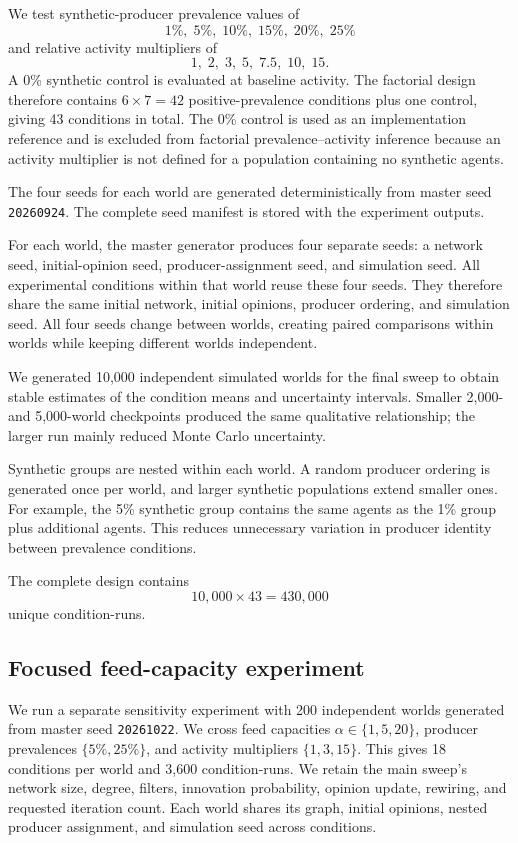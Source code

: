 \documentclass[runningheads]{llncs}
\begin{document}
We test synthetic-producer prevalence values of
\[
1\%,\;5\%,\;10\%,\;15\%,\;20\%,\;25\%
\]
and relative activity multipliers of
\[
1,\;2,\;3,\;5,\;7.5,\;10,\;15.
\]
A 0\% synthetic control is evaluated at baseline activity. The factorial design therefore contains \(6\times7=42\) positive-prevalence conditions plus one control, giving 43 conditions in total. The 0\% control is used as an implementation reference and is excluded from factorial prevalence--activity inference because an activity multiplier is not defined for a population containing no synthetic agents.

The four seeds for each world are generated deterministically from master seed \texttt{20260924}. The complete seed manifest is stored with the experiment outputs.

For each world, the master generator produces four separate seeds: a network seed, initial-opinion seed, producer-assignment seed, and simulation seed. All experimental conditions within that world reuse these four seeds. They therefore share the same initial network, initial opinions, producer ordering, and simulation seed. All four seeds change between worlds, creating paired comparisons within worlds while keeping different worlds independent.

We generated 10,000 independent simulated worlds for the final sweep to obtain stable estimates of the condition means and uncertainty intervals. Smaller 2,000- and 5,000-world checkpoints produced the same qualitative relationship; the larger run mainly reduced Monte Carlo uncertainty.

Synthetic groups are nested within each world. A random producer ordering is generated once per world, and larger synthetic populations extend smaller ones. For example, the 5\% synthetic group contains the same agents as the 1\% group plus additional agents. This reduces unnecessary variation in producer identity between prevalence conditions.

The complete design contains
\[
10{,}000 \times 43 = 430{,}000
\]
unique condition-runs.

\subsection{Focused feed-capacity experiment}
\label{sec:feed-design}

We run a separate sensitivity experiment with 200 independent worlds generated from master seed \texttt{20261022}. We cross feed capacities \(\alpha\in\{1,5,20\}\), producer prevalences \(\{5\%,25\%\}\), and activity multipliers \(\{1,3,15\}\). This gives 18 conditions per world and 3,600 condition-runs. We retain the main sweep's network size, degree, filters, innovation probability, opinion update, rewiring, and requested iteration count. Each world shares its graph, initial opinions, nested producer assignment, and simulation seed across conditions.
\end{document}
